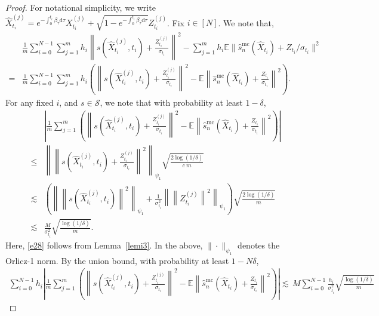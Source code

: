 \documentclass[12pts]{article}
\newcommand{\diff}{\mathrm{d}}
\newcommand{\sS}{ \mathscr{S}}
\newcommand{\hX}{ \widehat{X}}
\newcommand{\E}{\mathbb{E}}
\begin{document}
\begin{proof}
    For notational simplicity, we write $\hX_{t_i}^{(j)} =  e^{-\int_0^{t_i} \beta_\tau \diff  \tau } X_{t_i}^{(j)} + \sqrt{1-e^{- \int_0^{t_i} \beta_\tau \diff  \tau}} Z_{t_i}^{(j)}$. 
Fix $i \in [N]$. We note that,
\begin{align}
   & \frac{1}{ m}  \sum_{i=0}^{N-1}  \sum_{j=1}^m h_i \left\| s\left( \hX_{t_i}^{(j)}, t_i\right) + \frac{Z_{t_i}^{(j)}}{\sigma_{t_i}}  \right\|^2 - \sum_{j=1}^m h_i \E \|\hat{s}^{\mathrm{mc}}_n(\hX_{t_i}) + Z_{t_i}/\sigma_{t_i}\|^2\\
   = & \frac{1}{ m}  \sum_{i=0}^{N-1}  \sum_{j=1}^m h_i \left(\left\| s\left( \hX_{t_i}^{(j)}, t_i\right) + \frac{Z_{t_i}^{(j)}}{\sigma_{t_i}}  \right\|^2 - \E \left\|\hat{s}^{\mathrm{mc}}_n(\hX_{t_i}) + \frac{Z_{t_i}}{\sigma_{t_i}}\right\|^2\right) .
\end{align}
For any fixed $i$, and $s \in \sS$, we note that with probability at least $1-\delta$, 
\begingroup
\allowdisplaybreaks
\begin{align}
    & \left|\frac{1}{ m}   \sum_{j=1}^m \left(\left\| s\left( \hX_{t_i}^{(j)}, t_i\right) + \frac{Z_{t_i}^{(j)}}{\sigma_{t_i}}  \right\|^2 - \E \left\|\hat{s}^{\mathrm{mc}}_n(\hX_{t_i}) + \frac{Z_{t_i}}{\sigma_{t_i}}\right\|^2\right)\right| \nonumber\\
    \le & \left\| \left\| s\left( \hX_{t_i}^{(j)}, t_i\right) + \frac{Z_{t_i}^{(j)}}{\sigma_{t_i}}  \right\|^2\right\|_{\psi_1} \sqrt{\frac{2\log(1/\delta)}{ c \
    m}} \label{e28}\\
    \lesssim & \left(\left\| \left\| s\left( \hX_{t_i}^{(j)}, t_i\right) \right\|^2\right\|_{\psi_1}+ \frac{1}{\sigma_{t_i}^2} \left\|\left\|Z_{t_i}^{(j)} \right\|^2\right\|_{\psi_1} \right) \sqrt{\frac{2\log(1/\delta)}{m}}\nonumber\\
    \lesssim & \frac{M}{\sigma_{t_i}^2}\sqrt{\frac{\log(1/\delta)}{m}}.
\end{align}
\endgroup
Here, \eqref{e28} follows from Lemma~\ref{lemi3}. In the above, $\|\cdot\|_{\psi_1}$ denotes the Orlicz-1 norm. By the union bound, with probability at least $1-N \delta$, 
\begin{align}
    \sum_{i=0}^{N-1} h_i\left|\frac{1}{ m}   \sum_{j=1}^m \left(\left\| s\left( \hX_{t_i}^{(j)}, t_i\right) + \frac{Z_{t_i}^{(j)}}{\sigma_{t_i}}  \right\|^2 - \E \left\|\hat{s}^{\mathrm{mc}}_n(\hX_{t_i}) + \frac{Z_{t_i}}{\sigma_{t_i}}\right\|^2\right)\right| 
    \lesssim \,  M \sum_{i=0}^{N-1} \frac{h_i}{\sigma_{t_i}^2}\sqrt{\frac{\log(1/\delta)}{m}}
\end{align}

\end{proof}
\end{document}
